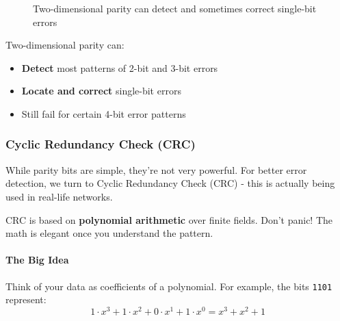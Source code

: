 \begin{figure}[h]
    \centering
    \caption{Two-dimensional parity can detect and sometimes correct single-bit errors}
    \label{fig:2d_parity}
\end{figure}

Two-dimensional parity can:
\begin{itemize}
    \item \textbf{Detect} most patterns of 2-bit and 3-bit errors
    \item \textbf{Locate and correct} single-bit errors
    \item Still fail for certain 4-bit error patterns
\end{itemize}

\subsubsection{Cyclic Redundancy Check (CRC)}
While parity bits are simple, they're not very powerful. For better error detection, we turn to Cyclic Redundancy Check (CRC) - this is actually being used in real-life networks.

CRC is based on \textbf{polynomial arithmetic} over finite fields. Don't panic! The math is elegant once you understand the pattern.

\paragraph{The Big Idea}
Think of your data as coefficients of a polynomial. For example, the bits \texttt{1101} represent:
\[
1 \cdot x^3 + 1 \cdot x^2 + 0 \cdot x^1 + 1 \cdot x^0 = x^3 + x^2 + 1
\]

